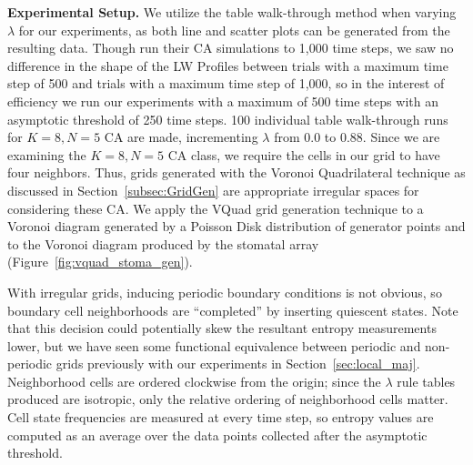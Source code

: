 \documentclass[a4paper,11pt]{article}
\begin{document}
\noindent \textbf{Experimental Setup.} We utilize the table walk-through method when varying $\lambda$ for our experiments, as both line and scatter plots can be generated from the resulting data. Though \citeauthor{wo90} run their CA simulations to 1,000 time steps, we saw no difference in the shape of the LW Profiles between trials with a maximum time step of 500 and trials with a maximum time step of 1,000, so in the interest of efficiency we run our experiments with a maximum of 500 time steps with an asymptotic threshold of 250 time steps. 100 individual table walk-through runs for $K=8, N=5$ CA are made, incrementing $\lambda$ from $0.0$ to $0.88$. Since we are examining the $K=8, N=5$ CA class, we require the cells in our grid to have four neighbors. Thus, grids generated with the Voronoi Quadrilateral technique as discussed in Section~\ref{subsec:GridGen} are appropriate irregular spaces for considering these CA. We apply the VQuad grid generation technique to a Voronoi diagram generated by a Poisson Disk distribution of generator points and to the Voronoi diagram produced by the stomatal array (Figure~\ref{fig:vquad_stoma_gen}).

With irregular grids, inducing periodic boundary conditions is not obvious, so boundary cell neighborhoods are ``completed'' by inserting quiescent states. Note that this decision could potentially skew the resultant entropy measurements lower, but we have seen some functional equivalence between periodic and non-periodic grids previously with our experiments in Section~\ref{sec:local_maj}. Neighborhood cells are ordered clockwise from the origin; since the $\lambda$ rule tables produced are isotropic, only the relative ordering of neighborhood cells matter. Cell state frequencies are measured at every time step, so entropy values are computed as an average over the data points collected after the asymptotic threshold.
\end{document}
